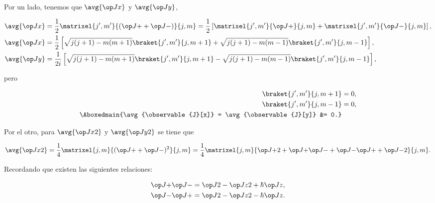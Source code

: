 \documentclass[./../main.tex]{subfiles}
\begin{document}
\begin{exercise}
\begin{solution}
            Por un lado, tenemos que \(\avg{\observable{J}[x]}\) y \(\avg{\observable{J}[y]}\),

            \begin{align*}
                \avg{\observable{J}[x]} &= \frac{1}{2}\matrixel{j^{\prime}, m^{\prime}}{(\observable{J}[+] + \observable{J}[-])}{j, m} = \frac{1}{2}\left[\matrixel{j^{\prime}, m^{\prime}}{\observable{J}[+]}{j, m} + \matrixel{j^{\prime}, m^{\prime}}{\observable{J}[-]}{j, m}\right],\\
                \avg{\observable{J}[x]} &= \frac{1}{2}\left[\sqrt{j(j + 1) - m(m + 1)}\braket{j^{\prime}, m^{\prime}}{j, m + 1} + \sqrt{j(j + 1) - m(m - 1)}\braket{j^{\prime}, m^{\prime}}{j, m - 1}\right],\\
                \avg{\observable{J}[y]} &= \frac{1}{2i}\left[\sqrt{j(j + 1) - m(m + 1)}\braket{j^{\prime}, m^{\prime}}{j, m + 1} - \sqrt{j(j + 1) - m(m - 1)}\braket{j^{\prime}, m^{\prime}}{j, m - 1}\right],
            \end{align*}

            pero

            \begin{align}
                \braket{j^{\prime}, m^{\prime}}{j, m + 1} &= 0,\nonumber\\
                \braket{j^{\prime}, m^{\prime}}{j, m - 1} &= 0,\nonumber\\
                \Aboxedmain{\avg{\observable{J}[x]} = \avg{\observable{J}[y]} &= 0.}\label{eq:expectation-values-Jx-Jy}
            \end{align}

            Por el otro, para \(\avg{\observable{J}[x][2]}\) y \(\avg{\observable{J}[y][2]}\) se tiene que

            \begin{equation*}
                \avg{\observable{J}[x][2]} = \frac{1}{4}\matrixel{j, m}{(\observable{J}[+] + \observable{J}[-])^{2}}{j, m} = \frac{1}{4}\matrixel{j, m}{\observable{J}[+][2] + \observable{J}[+]\observable{J}[-] + \observable{J}[-]\observable{J}[+] + \observable{J}[-][2]}{j, m}. 
            \end{equation*}

            Recordando que existen las siguientes relaciones:

            \begin{align*}
                \observable{J}[+]\observable{J}[-] &= \observable{J}[][2] - \observable{J}[z][2] + \hbar\observable{J}[z],\\
                \observable{J}[-]\observable{J}[+] &= \observable{J}[][2] - \observable{J}[z][2] - \hbar\observable{J}[z].
            \end{align*}


\end{solution}
\end{exercise}
\end{document}
